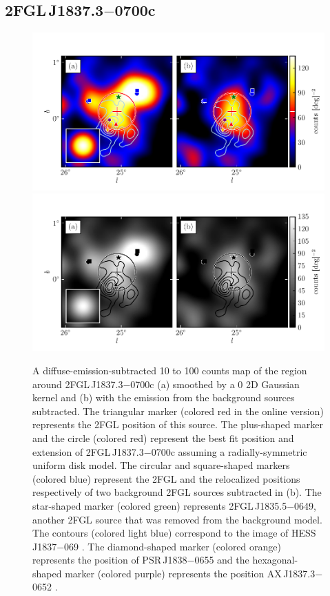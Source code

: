 \subsection{2FGL\,J1837.3$-$0700c}


\begin{figure}[htbp]
    \ifcolorfigure
      \includegraphics{source_plots/source_HESS_J1837-069_color.pdf}
    \else
      \includegraphics{source_plots/source_HESS_J1837-069_bw.pdf}
    \fi
  \caption{
  A diffuse-emission-subtracted 10 \gev to 100 \gev counts map of the
  region around 2FGL\,J1837.3$-$0700c (a) smoothed by a 0 2D Gaussian
  kernel and (b) with the emission from the background sources subtracted.
  The triangular marker (colored red in the online version) represents
  the 2FGL
  position of this source. 
  The plus-shaped marker and 
  the circle (colored red) represent the best fit position and extension
  of 2FGL\,J1837.3$-$0700c assuming a radially-symmetric uniform disk model. 
  The circular and square-shaped markers (colored
  blue) represent the 2FGL and the relocalized positions respectively of
  two background 2FGL sources subtracted in (b).  The star-shaped marker
  (colored green) represents 2FGL\,J1835.5$-$0649, another 2FGL source that was removed from the
  background model.  The contours (colored light blue) correspond to
  the \tev image of HESS\,J1837$-$069
  \citep{aharonian_2006a_h.e.s.s.-survey}.
  The diamond-shaped marker (colored orange) represents the position of PSR\,J1838$-$0655
  and the hexagonal-shaped marker (colored purple) represents the position AX\,J1837.3$-$0652
  \citep{gotthelf_2008a_discovery-young}.
  }
\end{figure}



